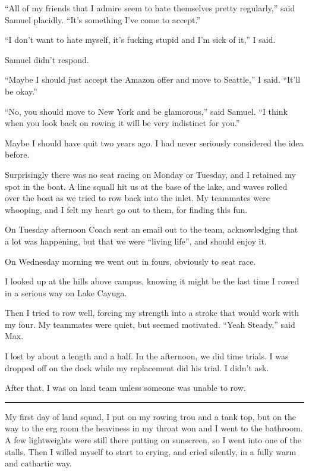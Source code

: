 ``All of my friends that I admire seem to hate themselves pretty regularly,''
said Samuel placidly.  ``It's something I've come to accept.''

``I don't want to hate myself, it's fucking stupid and I'm sick of it,'' I said.  

Samuel didn't respond.

``Maybe I should just accept the Amazon offer and move to Seattle,'' I said.
``It'll be okay.''

``No, you should move to New York and be glamorous,'' said Samuel.  ``I think
when you look back on rowing it will be very indistinct for you.'' 

Maybe I should have quit two years ago.  I had never seriously considered the
idea before.

Surprisingly there was no seat racing on Monday or Tuesday, and I retained my
spot in the boat.  A line squall hit us at the base of the lake, and waves
rolled over the boat as we tried to row back into the inlet.  My teammates were
whooping, and I felt my heart go out to them, for finding this fun.

On Tuesday afternoon Coach sent an email out to the team, acknowledging that a
lot was happening, but that we were ``living life'', and should enjoy it.

On Wednesday morning we went out in fours, obviously to seat race.

I looked up at the hills above campus, knowing it might be the last time I rowed
in a serious way on Lake Cayuga.  

Then I tried to row well, forcing my strength into a stroke that would work with
my four.  My teammates were quiet, but seemed motivated. ``Yeah Steady,'' said
Max.

I lost by about a length and a half.  In the afternoon, we did time trials.  I
was dropped off on the dock while my replacement did his trial.  I didn't ask.

After that, I was on land team unless someone was unable to row.

\plainfancybreak{12pt}{2}{* * *}


My first day of land squad, I put on my rowing trou and a tank top, but on the
way to the erg room the heaviness in my throat won and I went to the bathroom.
A few lightweights  were still there putting on sunscreen, so I went into one of
the stalls.  Then I willed myself to start to crying, and cried silently, in a
fully warm and cathartic way.  


